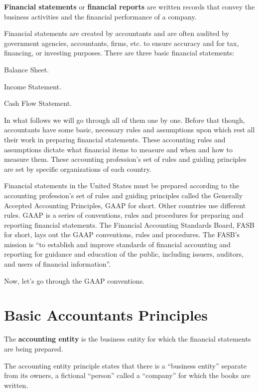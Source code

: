 \textbf{Financial statements} or \textbf{financial reports} are written records that convey the business activities and
the financial performance of a company.
\ed

Financial statements are created by accountants and are often audited by government agencies, accountants, firms, etc.
to ensure accuracy and for tax, financing, or investing purposes. There are three basic financial statements:
\bit
\item Balance Sheet.
\item Income Statement.
\item Cash Flow Statement.
\eit

In what follows we will go through all of them one by one. Before that though, accountants have some basic, necessary
rules and assumptions upon which rest all their work in preparing financial statements. These accounting rules and
assumptions dictate what financial items to measure and when and how to measure them. These accounting profession's
set of rules and guiding principles are set by specific organizations of each country.

\be
Financial statements in the United States must be prepared according to the accounting profession's set of rules and
guiding principles called the Generally Accepted Accounting Principles, GAAP for short. Other countries use different
rules. GAAP is a series of conventions, rules and procedures for preparing and reporting financial statements. The
Financial Accounting Standards Board, FASB for short, lays out the GAAP conventions, rules and procedures. The FASB's
mission is ``to establish and improve standards of financial accounting and reporting for guidance and education of
the public, including issuers, auditors, and users of financial information''.
\ee

Now, let's go through the GAAP conventions.

\section{Basic Accountants Principles}

The \textbf{accounting entity} is the business entity for which the financial statements are being prepared.
\ed

The accounting entity principle states that there is a ``business entity'' separate from its owners, a fictional
``person'' called a ``company'' for which the books are written.

